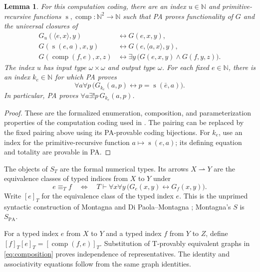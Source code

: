 \documentclass[11pt]{article}
\newtheorem{lemma}[theorem]{Lemma}
\newcommand{\N}{\mathbb N}
\newcommand{\PA}{\mathrm{PA}}
\begin{document}
\begin{lemma}\label{lem:arithmetized-evaluation}
For this computation coding, there are an index $u\in\N$ and
primitive-recursive functions
$\operatorname{s},\operatorname{comp}:\N^2\to\N$
such that PA proves functionality
of $G$ and the universal closures of
\begin{align}
 G_u(\langle e,x\rangle,y)
   &\leftrightarrow G(e,x,y),
   \label{eq:arithmetized-universal}\\
 G(\operatorname{s}(e,a),x,y)
   &\leftrightarrow G(e,\langle a,x\rangle,y),
   \label{eq:arithmetized-specialization}\\
 G(\operatorname{comp}(f,e),x,z)
   &\leftrightarrow
     \exists y\,\bigl(G(e,x,y)\land G(f,y,z)\bigr).
   \label{eq:composition}
\end{align}
The index $u$ has input type $\omega\times\omega$ and output
type $\omega$. For each fixed $e\in\N$, there is an index
$k_e\in\N$ for which PA proves
\[
 \forall a\forall p\,
 \bigl(G_{k_e}(a,p)\leftrightarrow
       p=\operatorname{s}(\bar e,a)\bigr).
\]
In particular, PA proves $\forall a\exists!p\,G_{k_e}(a,p)$.
\end{lemma}
\begin{proof}
These are the formalized enumeration, composition, and
parameterization properties of the computation coding used in
\cite[p.~108; p.~115, Note~1]{Montagna}.
The pairing can be replaced by the fixed pairing above using its
PA-provable coding bijections.
For $k_e$, use an index for the primitive-recursive function
$a\mapsto\operatorname{s}(e,a)$; its defining equation and
totality are provable in PA.
\end{proof}

The objects of $S_T$ are the formal numerical types. Its arrows
$X\rightharpoonup Y$ are the equivalence classes of typed indices
from $X$ to $Y$ under
\begin{equation}\label{eq:uniform}
 e\equiv_T f
 \quad\Longleftrightarrow\quad
 T\vdash \forall x\forall y\,
       \bigl(G_e(x,y)\leftrightarrow G_f(x,y)\bigr).
\end{equation}
Write $[e]_T$ for the equivalence class of the typed index $e$.
This is the unprimed syntactic construction of Montagna and
Di Paola--Montagna \cite{Montagna,DPM}; Montagna's $S$ is $S_{\PA}$.

For a typed index $e$ from $X$ to $Y$ and a typed index $f$ from
$Y$ to $Z$, define
$[f]_T[e]_T=[\operatorname{comp}(f,e)]_T$.
Substitution of T-provably equivalent graphs in
\eqref{eq:composition} proves independence of representatives.
The identity and associativity equations follow from the same
graph identities.
\end{document}
